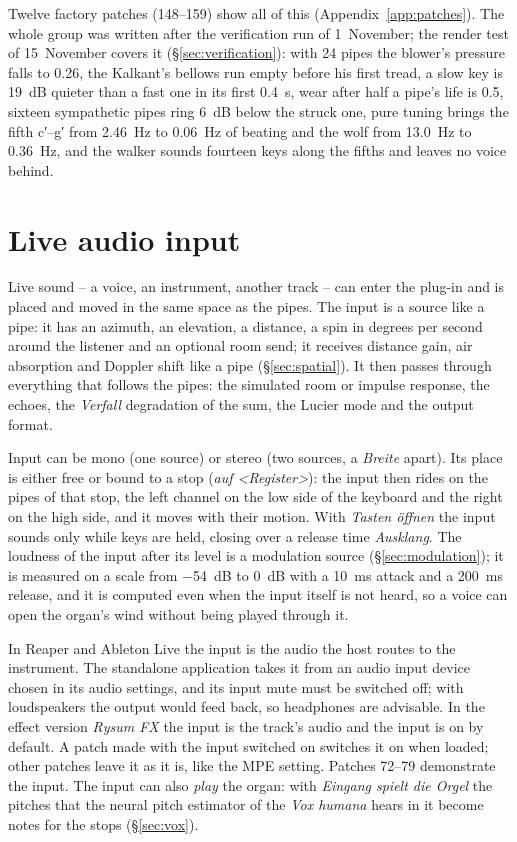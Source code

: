 \documentclass[11pt,a4paper,parskip=half,DIV=11,toc=bibliography]{scrartcl}
\newcommand{\ui}[1]{\emph{#1}}                 %
\begin{document}
Twelve factory patches (148--159) show all of this (Appendix~\ref{app:patches}). The whole group was written after the verification run
of 1~November; the render test of 15~November covers it (\S\ref{sec:verification}): with 24 pipes the blower's pressure falls to 0.26, the Kalkant's
bellows run empty before his first tread, a slow key is \SI{19}{dB} quieter than a fast one in its first \SI{0.4}{s}, wear after half a pipe's life is
0.5, sixteen sympathetic pipes ring \SI{6}{dB} below the struck one, pure tuning brings the fifth c′--g′ from \SI{2.46}{Hz} to \SI{0.06}{Hz} of beating
and the wolf from \SI{13.0}{Hz} to \SI{0.36}{Hz}, and the walker sounds fourteen keys along the fifths and leaves no voice behind.

\section{Live audio input}
\label{sec:input}

Live sound -- a voice, an instrument, another track -- can enter the plug-in and is placed and moved in the
same space as the pipes. The input is a source like a pipe: it has an azimuth, an elevation, a distance, a
spin in degrees per second around the listener and an optional room send; it receives distance gain, air
absorption and Doppler shift like a pipe (\S\ref{sec:spatial}). It then passes through everything that
follows the pipes: the simulated room or impulse response, the echoes, the \ui{Verfall} degradation of the
sum, the Lucier mode and the output format.

Input can be mono (one source) or stereo (two sources, a \ui{Breite} apart). Its place is either free or
bound to a stop (\ui{auf <Register>}): the input then rides on the pipes of that stop, the left channel on the
low side of the keyboard and the right on the high side, and it moves with their motion. With \ui{Tasten
öffnen} the input sounds only while keys are held, closing over a release time \ui{Ausklang}. The loudness of
the input after its level is a modulation source (\S\ref{sec:modulation}); it is measured on a scale from
\SI{-54}{dB} to \SI{0}{dB} with a \SI{10}{ms} attack and a \SI{200}{ms} release, and it is computed even when
the input itself is not heard, so a voice can open the organ's wind without being played through it.

In Reaper and Ableton Live the input is the audio the host routes to the instrument. The standalone
application takes it from an audio input device chosen in its audio settings, and its input mute must be
switched off; with loudspeakers the output would feed back, so headphones are advisable. In the effect version \emph{Rysum FX} the input is the track's audio and the input is on by
default. A patch made with the input switched on switches it on when loaded; other patches leave it as it is,
like the MPE setting. Patches 72--79 demonstrate the input. The input can also \emph{play} the organ: with \ui{Eingang spielt die Orgel} the
pitches that the neural pitch estimator of the \ui{Vox humana} hears in it become notes for the stops (\S\ref{sec:vox}).
\end{document}
